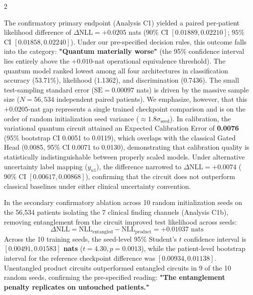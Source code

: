 \documentclass[10pt,a4paper,twoside]{article}
\begin{document}
\begin{multicols}{2}

The confirmatory primary endpoint (Analysis C1) yielded a paired per-patient likelihood difference of $\Delta\text{NLL} = \mathbf{+0.0205}$ nats ($90\%$ CI $[0.01889, 0.02210]$; $95\%$ CI $[0.01858, 0.02240]$). Under our pre-specified decision rules, this outcome falls into the category: \textbf{"Quantum materially worse"} (the 95\% confidence interval lies entirely above the $+0.010$-nat operational equivalence threshold). The quantum model ranked lowest among all four architectures in classification accuracy (53.71\%), likelihood (1.1362), and discrimination (0.7436). The small test-sampling standard error ($\text{SE} = 0.00097$ nats) is driven by the massive sample size ($N = 56,534$ independent paired patients). We emphasize, however, that this $+0.0205$-nat gap represents a single trained checkpoint comparison and is on the order of random initialization seed variance ($\approx 1.8 \sigma_{\text{seed}}$). In calibration, the variational quantum circuit attained an Expected Calibration Error of \textbf{0.0076} (95\% bootstrap CI 0.0051 to 0.0119), which overlaps with the classical Gated Head (0.0085, 95\% CI 0.0071 to 0.0130), demonstrating that calibration quality is statistically indistinguishable between properly scaled models. Under alternative uncertainty label mapping ($y_{u1}$), the difference narrowed to $\Delta\text{NLL} = +0.0074$ ($90\%$ CI $[0.00617, 0.00868]$), confirming that the circuit does not outperform classical baselines under either clinical uncertainty convention.

In the secondary confirmatory ablation across 10 random initialization seeds on the 56,534 patients isolating the 7 clinical finding channels (Analysis C1b), removing entanglement from the circuit improved test likelihood across seeds:
\begin{equation}
\Delta\text{NLL} = \text{NLL}_{\text{entangled}} - \text{NLL}_{\text{product}} = \mathbf{+0.01037} \text{ nats}
\end{equation}
Across the 10 training seeds, the seed-level 95\% Student's $t$ confidence interval is \textbf{$[0.00491, 0.01583]$ nats} ($t = 4.30, p = 0.0013$), while the patient-level bootstrap interval for the reference checkpoint difference was $[0.00934, 0.01138]$. Unentangled product circuits outperformed entangled circuits in 9 of the 10 random seeds, confirming the pre-specified reading: \textbf{"The entanglement penalty replicates on untouched patients."}


\end{multicols}
\end{document}
